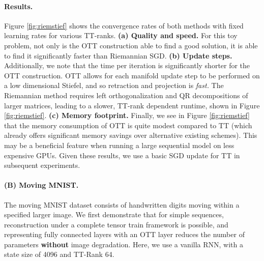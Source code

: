 \paragraph{Results.} Figure \ref{fig:riemstief} shows the
convergence rates of both methods with fixed learning rates for various TT-ranks.
\textbf{(a) Quality and speed.} For this toy problem, not only is the OTT construction able to find a good solution, it is able to find it significantly faster than Riemannian SGD.
\textbf{(b) Update steps.} Additionally, we note that the time per iteration is significantly shorter for the OTT construction.
OTT allows for each manifold update step to be performed on a low dimensional Stiefel,
and so retraction and projection is \textit{fast.}
The Riemannian method requires left orthogonalization and QR decompositions
of larger matrices, leading to a slower, TT-rank dependent runtime, shown in Figure \ref{fig:riemstief}.
\textbf{(c) Memory footprint.} Finally, we see in Figure \ref{fig:riemstief} that the memory consumption of OTT is quite modest compared to TT (which already offers
significant memory savings over alternative existing schemes). This may be a beneficial feature
when running a large sequential model on less expensive GPUs. 
Given these results, we use a basic SGD update for TT in subsequent experiments. 

\paragraph{(B) Moving MNIST.}
The moving MNIST dataset \citep{srivastava2015unsupervised} consists of handwritten digits moving within a specified larger image.
We first demonstrate that
for simple sequences, reconstruction under a complete tensor train framework is possible,
and representing fully connected layers with an OTT layer
reduces the number of parameters \textbf{without} image degradation.
Here, we use a vanilla RNN, with a state size of 4096 and TT-Rank 64.

